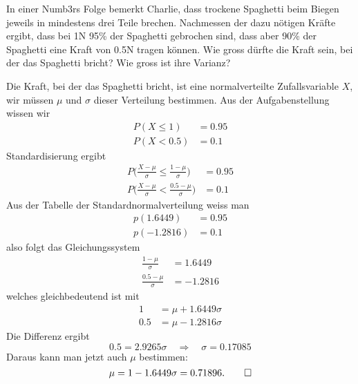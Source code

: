 In einer Numb3rs Folge bemerkt Charlie, dass trockene Spaghetti beim
Biegen jeweils
in mindestens drei Teile brechen. Nachmessen der dazu nötigen Kräfte
ergibt, dass bei 1N 95\% der Spaghetti gebrochen sind, dass aber 90\%
der Spaghetti eine Kraft von 0.5N tragen können. Wie gross dürfte
die Kraft sein, bei der das Spaghetti bricht? Wie gross ist ihre Varianz?


\begin{loesung}
Die Kraft, bei der das Spaghetti bricht, ist eine normalverteilte
Zufallsvariable $X$, wir müssen $\mu$ und $\sigma$ dieser Verteilung
bestimmen. Aus der Aufgabenstellung wissen wir
\begin{align*}
P(X \le 1)&=0.95\\
P(X < 0.5)&=0.1
\end{align*}
Standardisierung ergibt
\begin{align*}
P\biggl(\frac{X-\mu}{\sigma} \le \frac{1-\mu}{\sigma}\biggr)&=0.95\\
P\biggl(\frac{X-\mu}{\sigma} < \frac{0.5-\mu}{\sigma}\biggr)&=0.1
\end{align*}
Aus der Tabelle der Standardnormalverteilung weiss man
\begin{align*}
p(1.6449)&=0.95\\
p(-1.2816)&=0.1
\end{align*}
also folgt das Gleichungssystem
\begin{align*}
\frac{1-\mu}{\sigma}&=1.6449\\
\frac{0.5-\mu}{\sigma}&=-1.2816
\end{align*}
welches gleichbedeutend ist mit
\begin{align*}
1&=\mu+1.6449\sigma\\
0.5&=\mu-1.2816\sigma
\end{align*}
Die Differenz ergibt
\[
0.5 = 2.9265\sigma\quad\Rightarrow\quad \sigma = 0.17085
\]
Daraus kann man jetzt auch $\mu$ bestimmen:
\[
\mu = 1-1.6449\sigma =  0.71896.
\qedhere
\]
\end{loesung}

